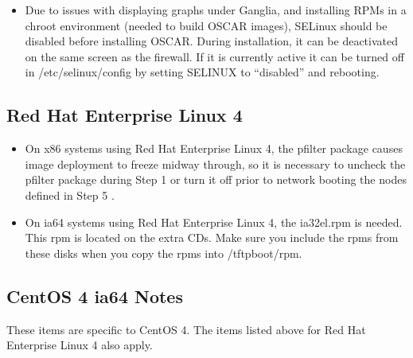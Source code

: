 \begin{itemize}

\item Due to issues with displaying graphs under Ganglia, and installing
  RPMs in a chroot environment (needed to build OSCAR images), SELinux should
  be disabled before installing OSCAR.  During installation, it can be
  deactivated on the same screen as the firewall.  If it is currently
  active it can be turned off in /etc/selinux/config by setting SELINUX 
  to ``disabled'' and rebooting.

\end{itemize}


\subsection{Red Hat Enterprise Linux 4}
\label{subsec:rhel4notes}

\begin{itemize}

\item On x86 systems using Red Hat Enterprise Linux 4, the pfilter package 
  causes image deployment to freeze midway through, so it is necessary to
  uncheck the pfilter package during Step 1  or turn it off prior to network booting the nodes defined 
  in Step 5 .

\item On ia64 systems using Red Hat Enterprise Linux 4, the ia32el.rpm is
  needed.  This rpm is located on the extra CDs.  Make sure you include
  the rpms from these disks when you copy the rpms into /tftpboot/rpm.

\end{itemize}


\subsection{CentOS 4 ia64 Notes}
\label{subsec:centos4notes}

These items are specific to CentOS 4.  The items listed above for Red Hat
Enterprise Linux 4 also apply.

